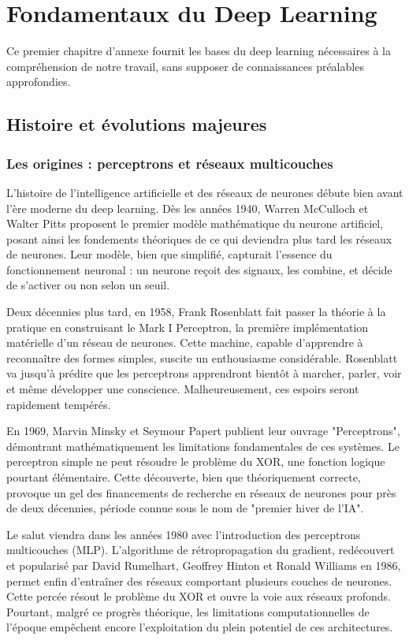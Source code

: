 
\chapter{Fondamentaux du Deep Learning}

Ce premier chapitre d'annexe fournit les bases du deep learning nécessaires à la compréhension de notre travail, sans supposer de connaissances préalables approfondies.

\section{Histoire et évolutions majeures}

\subsection{Les origines : perceptrons et réseaux multicouches}

L'histoire de l'intelligence artificielle et des réseaux de neurones débute bien avant l'ère moderne du deep learning. Dès les années 1940, Warren McCulloch et Walter Pitts proposent le premier modèle mathématique du neurone artificiel, posant ainsi les fondements théoriques de ce qui deviendra plus tard les réseaux de neurones. Leur modèle, bien que simplifié, capturait l'essence du fonctionnement neuronal : un neurone reçoit des signaux, les combine, et décide de s'activer ou non selon un seuil.

Deux décennies plus tard, en 1958, Frank Rosenblatt fait passer la théorie à la pratique en construisant le Mark I Perceptron, la première implémentation matérielle d'un réseau de neurones. Cette machine, capable d'apprendre à reconnaître des formes simples, suscite un enthousiasme considérable. Rosenblatt va jusqu'à prédire que les perceptrons apprendront bientôt à marcher, parler, voir et même développer une conscience. Malheureusement, ces espoirs seront rapidement tempérés.

En 1969, Marvin Minsky et Seymour Papert publient leur ouvrage "Perceptrons", démontrant mathématiquement les limitations fondamentales de ces systèmes. Le perceptron simple ne peut résoudre le problème du XOR, une fonction logique pourtant élémentaire. Cette découverte, bien que théoriquement correcte, provoque un gel des financements de recherche en réseaux de neurones pour près de deux décennies, période connue sous le nom de "premier hiver de l'IA".

Le salut viendra dans les années 1980 avec l'introduction des perceptrons multicouches (MLP). L'algorithme de rétropropagation du gradient, redécouvert et popularisé par David Rumelhart, Geoffrey Hinton et Ronald Williams en 1986, permet enfin d'entraîner des réseaux comportant plusieurs couches de neurones. Cette percée résout le problème du XOR et ouvre la voie aux réseaux profonds. Pourtant, malgré ce progrès théorique, les limitations computationnelles de l'époque empêchent encore l'exploitation du plein potentiel de ces architectures.

